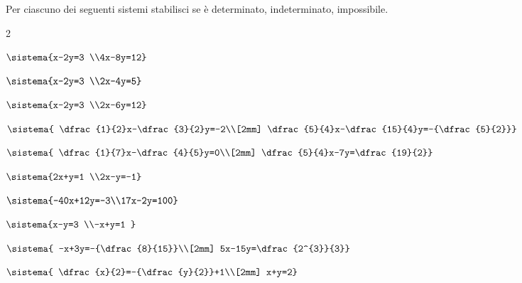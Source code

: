 % 
% 




\begin{esercizio}
 \label{ese:22.31}
Per ciascuno dei seguenti sistemi stabilisci se è determinato,
indeterminato, impossibile.
\begin{htmulticols}{2}
\begin{enumeratea}
\item \(\sistema{x-2y=3 \\4x-8y=12}\)
\item \(\sistema{x-2y=3 \\2x-4y=5}\)
\item \(\sistema{x-2y=3 \\2x-6y=12}\)
\item \(\sistema{
\dfrac{1}{2}x-\dfrac{3}{2}y=-2\\[2mm]
\dfrac{5}{4}x-\dfrac{15}{4}y=-{\dfrac{5}{2}}}\)
\item \(\sistema{
\dfrac{1}{7}x-\dfrac{4}{5}y=0\\[2mm]
\dfrac{5}{4}x-7y=\dfrac{19}{2}}\)
\item \(\sistema{2x+y=1 \\2x-y=-1}\)
\item \(\sistema{-40x+12y=-3\\17x-2y=100}\)
\item \(\sistema{x-y=3 \\-x+y=1 }\)
\item \(\sistema{
-x+3y=-{\dfrac{8}{15}}\\[2mm]
5x-15y=\dfrac{2^{3}}{3}}\)
\item \(\sistema{
\dfrac{x}{2}=-{\dfrac{y}{2}}+1\\[2mm]
x+y=2}\)
\end{enumeratea}
\end{htmulticols}
\end{esercizio}

